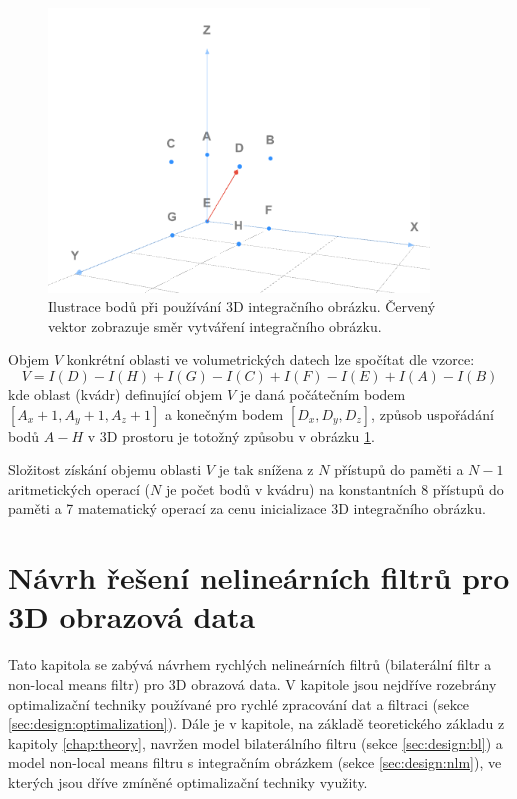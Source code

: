 \begin{figure} [H]
    \centering
    \label{fig:nlm:3d_integral_image}
    \includegraphics[width=0.9\textwidth]{figures/3d_integral_image.png}
    \caption{Ilustrace bodů při používání 3D integračního obrázku. Červený vektor zobrazuje směr vytváření integračního obrázku.}
\end{figure}

Objem $V$ konkrétní oblasti ve volumetrických datech lze spočítat dle vzorce:
\begin{equation}
    V = I(D) - I(H) + I(G) - I(C) + I(F) - I(E) + I(A) - I(B)
\end{equation}
kde oblast (kvádr) definující objem $V$ je daná počátečním bodem $[A_x + 1, A_y + 1, A_z + 1]$ a konečným bodem $[D_x, D_y, D_z]$, způsob uspořádání bodů $A-H$ v 3D prostoru je totožný způsobu v obrázku \ref{fig:nlm:3d_integral_image}.

Složitost získání objemu oblasti $V$ je tak snížena z $N$ přístupů do paměti a $N - 1$ aritmetických operací ($N$ je počet bodů v kvádru) na konstantních 8 přístupů do paměti a 7 matematický operací za cenu inicializace 3D integračního obrázku.

\chapter{Návrh řešení nelineárních filtrů pro 3D obrazová data}
\label{chap:design}
Tato kapitola se zabývá návrhem rychlých nelineárních filtrů (bilaterální filtr a non-local means filtr) pro 3D obrazová data. V kapitole jsou nejdříve rozebrány optimalizační techniky používané pro rychlé zpracování dat a filtraci (sekce \ref{sec:design:optimalization}). Dále je v kapitole, na základě teoretického základu z kapitoly \ref{chap:theory}, navržen model bilaterálního filtru (sekce \ref{sec:design:bl}) a model non-local means filtru s integračním obrázkem (sekce \ref{sec:design:nlm}), ve kterých jsou dříve zmíněné optimalizační techniky využity. 

